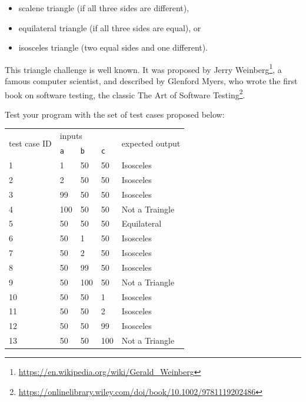\documentclass[
  fontsize=10pt,
  a4paper,
]{scrartcl}
\begin{document}
\begin{enumerate}
\begin{itemize}
\item scalene triangle (if all three sides are different), 
\item equilateral triangle (if all three sides are equal), or
\item isosceles triangle (two equal sides and one different).
\end{itemize}

This triangle challenge is well known. It was proposed by
Jerry Weinberg\footnote{\url{https://en.wikipedia.org/wiki/Gerald_Weinberg}}, a famous computer scientist, and described by Glenford Myers, who wrote the first book on software testing, the classic The Art of Software Testing\footnote{\url{https://onlinelibrary.wiley.com/doi/book/10.1002/9781119202486}}.

Test your program with the set of test cases proposed below:


\begin{tabular}{|l|l|l|l|l|}
\hline
\multirow{2}{*}{test case ID} & \multicolumn{3}{l|}{inputs} & \multirow{2}{*}{expected output}   \\ \cline{2-4} 
             & \verb+a+ & \verb+b+ & \verb+c+ &  \\
\hline\hline
1  & 1 & 50 & 50 & Isosceles \\
2           & 2          & 50          & 50          & Isosceles          \\
3           & 99         & 50          & 50          & Isosceles          \\
4           & 100        & 50          & 50          & Not a Traingle     \\
5           & 50         & 50          & 50          & Equilateral        \\
6           & 50         & 1           & 50          & Isosceles          \\
7           & 50         & 2           & 50          & Isosceles          \\
8           & 50         & 99          & 50          & Isosceles          \\
9           & 50         & 100         & 50          & Not a Triangle     \\
10          & 50         & 50          & 1           & Isosceles          \\
11          & 50         & 50          & 2           & Isosceles          \\
12          & 50         & 50          & 99          & Isosceles          \\
13          & 50         & 50          & 100         & Not a Triangle   \\
\hline
\end{tabular}


\end{enumerate}
\end{document}
